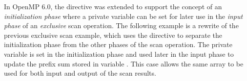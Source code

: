 

In OpenMP 6.0, the  directive was extended to support 
the concept of an \emph{initialization phase} where a private variable 
can be set for later use in the \emph{input phase} of
an \emph{exclusive} scan operation.
The following example is a rewrite of the previous exclusive scan
example, which uses the  directive to separate
the initialization phase from the other phases of the scan operation.
The private variable  is set in the initialization phase
and used later in the input phase to update the prefix sum stored
in variable .
This case allows the same array  to be used for
both input and output of the scan results.


